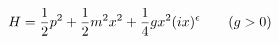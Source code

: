 \begin{equation}
H={1\over2}p^2+{1\over2}m^2x^2+{1\over4}gx^2(ix)^\epsilon\qquad(g>0)
\label{e35}
\end{equation}

